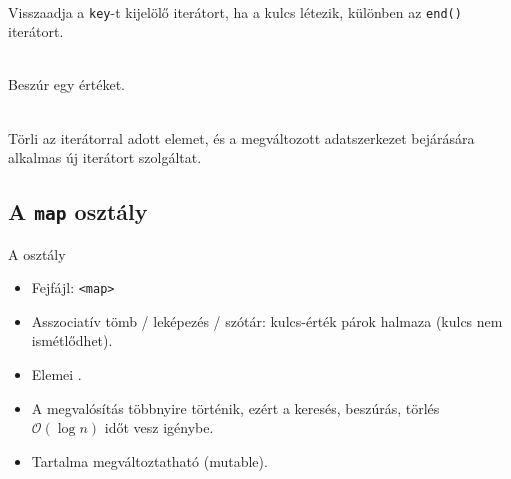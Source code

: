 \begin{frame}
    \begin{description}[m]
        \item[\hiv{\href{https://en.cppreference.com/w/cpp/container/set/find}{\texttt{find(key)}}}] \hfill \\ Visszaadja a \texttt{key}-t kijelölő iterátort, ha a kulcs létezik, különben az \texttt{end()} iterátort.
        \item[\hiv{\href{https://en.cppreference.com/w/cpp/container/set/insert}{\texttt{insert(value)}}}] \hfill \\ Beszúr egy értéket.
        \item[\hiv{\href{https://en.cppreference.com/w/cpp/container/set/erase}{\texttt{erase(pos)}}}] \hfill \\ Törli az iterátorral adott elemet, és a megváltozott adatszerkezet bejárására alkalmas új iterátort szolgáltat.
    \end{description}
\end{frame}

\subsection{A \texttt{map} osztály}

\begin{frame}
    A  osztály
    \begin{itemize}
        \item Fejfájl: \texttt{<map>}
        \item Asszociatív tömb / leképezés / szótár: kulcs-érték párok halmaza (kulcs nem ismétlődhet).
        \item Elemei .
        \item A megvalósítás többnyire  történik, ezért a keresés, beszúrás, törlés $\mathcal{O}(\log{}n)$ időt vesz igénybe.
        \item Tartalma megváltoztatható (mutable).
    \end{itemize}
\end{frame}

\begin{frame}
    \begin{exampleblock}{}
        
    \end{exampleblock}
\end{frame}

